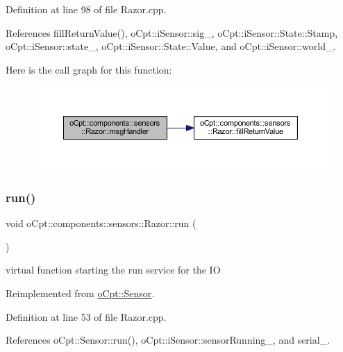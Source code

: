 Definition at line 98 of file Razor.\+cpp.



References fill\+Return\+Value(), o\+Cpt\+::i\+Sensor\+::sig\+\_\+, o\+Cpt\+::i\+Sensor\+::\+State\+::\+Stamp, o\+Cpt\+::i\+Sensor\+::state\+\_\+, o\+Cpt\+::i\+Sensor\+::\+State\+::\+Value, and o\+Cpt\+::i\+Sensor\+::world\+\_\+.

Here is the call graph for this function\+:
\nopagebreak
\begin{figure}[H]
\begin{center}
\leavevmode
\includegraphics[width=350pt]{classo_cpt_1_1components_1_1sensors_1_1_razor_a8d8e051113a86789851faca74d3da303_cgraph}
\end{center}
\end{figure}
\hypertarget{classo_cpt_1_1components_1_1sensors_1_1_razor_ad93891ffb2d47e56d1417f0a40026c6e}{}\label{classo_cpt_1_1components_1_1sensors_1_1_razor_ad93891ffb2d47e56d1417f0a40026c6e} 
\subsubsection{\texorpdfstring{run()}{run()}}
{\footnotesize\ttfamily void o\+Cpt\+::components\+::sensors\+::\+Razor\+::run (\begin{DoxyParamCaption}{ }\end{DoxyParamCaption})\hspace{0.3cm}{\ttfamily [virtual]}}

virtual function starting the run service for the IO 

Reimplemented from \hyperlink{classo_cpt_1_1_sensor_aef25b0e5f3a8358ee81c97c73909fbe6}{o\+Cpt\+::\+Sensor}.



Definition at line 53 of file Razor.\+cpp.



References o\+Cpt\+::\+Sensor\+::run(), o\+Cpt\+::i\+Sensor\+::sensor\+Running\+\_\+, and serial\+\_\+.


